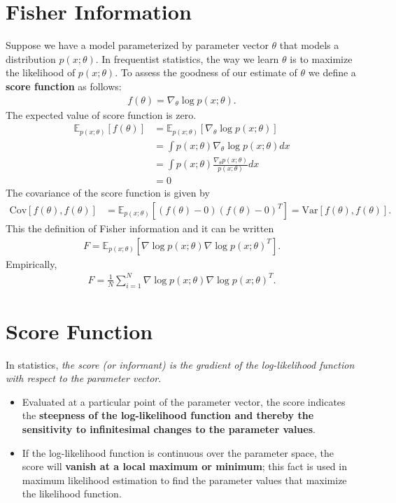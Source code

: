\begin{appendices}
\section{Fisher Information}
Suppose we have a model parameterized by parameter vector $\theta$ that models a distribution $p(x;\theta)$. In frequentist statistics, the way we learn $\theta$ is to maximize the likelihood of $p(x;\theta)$. To assess the goodness of our estimate of $\theta$ we define a \textbf{score function} as follows:
\begin{align*}
	f(\theta) = \nabla_\theta \log p(x;\theta).
\end{align*}
The expected value of score function is zero. 
\begin{align*}
	\mathbb{E}_{p(x;\theta)}[f(\theta)] &= \mathbb{E}_{p(x;\theta)}[\nabla_\theta \log p(x;\theta)]\\
	&= \int p(x;\theta) \nabla_\theta \log p(x;\theta) dx\\
	&= \int p(x;\theta) \frac{\nabla_\theta p(x;\theta)}{p(x;\theta)}  dx\\
	&= 0
\end{align*}
The covariance of the score function is given by
\begin{align*}
	\textrm{Cov}[f(\theta), f(\theta)] &= \mathbb{E}_{p(x;\theta)}[(f(\theta)-0)(f(\theta)-0)^T]= \textrm{Var}[f(\theta), f(\theta)].
\end{align*}
This the definition of Fisher information and it can be written 
\begin{align*}
	F = \mathbb{E}_{p(x;\theta)}[\nabla \log p(x;\theta)\nabla \log p(x;\theta)^T].
\end{align*}
Empirically, 
\begin{align*}
	F = \frac{1}{N}\sum_{i=1}^{N}\nabla \log p(x;\theta)\nabla \log p(x;\theta)^T.
\end{align*}

\section{Score Function}
In statistics, \textit{the score (or informant) is the gradient of the log-likelihood function with respect to the parameter vector}. 
\begin{itemize}
	\item Evaluated at a particular point of the parameter vector, the score indicates the \textbf{steepness of the log-likelihood function and thereby the sensitivity to infinitesimal changes to the parameter values}.
	\item If the log-likelihood function is continuous over the parameter space, the score will \textbf{vanish at a local maximum or minimum}; this fact is used in maximum likelihood estimation to find the parameter values that maximize the likelihood function.
\end{itemize}


\end{appendices}
